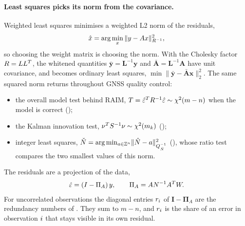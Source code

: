 \documentclass[main.tex]{subfiles}
\begin{document}
\paragraph{Least squares picks its norm from the covariance.}
Weighted least squares minimises a weighted L2 norm of the residuals,
\begin{equation}
\hat{x} = \arg\min_{x}\,
  \lVert y - Ax\rVert^2_{R^{-1}},
\label{eq:la-wls-norm}
\end{equation}
so choosing the weight matrix is choosing the norm.  With the Cholesky
factor $R = LL^{T}$, the whitened quantities
$\bar{\bm{y}} = \bm{L}^{-1}\bm{y}$ and $\bar{\bm{A}} = \bm{L}^{-1}\bm{A}$ have
unit covariance, and  becomes ordinary least squares,
$\min\lVert\bar{\bm{y}} - \bar{\bm{A}}\bm{x}\rVert_2^2$.  The same squared
norm returns throughout GNSS quality control:
\begin{itemize}[leftmargin=*, itemsep=1pt]
\item the overall model test behind RAIM,
      $T = \hat{\varepsilon}^{T}R^{-1}\hat{\varepsilon}
      \sim \chi^2(m-n)$ when the model is correct
      ();
\item the Kalman innovation test,
      $\nu^{T}S^{-1}\nu \sim \chi^2(m_k)$
      ();
\item integer least squares,
      $\check{N} = \arg\min_{a\in\mathbb{Z}^n}
      \lVert\hat{N} - a\rVert^2_{Q_{\hat N}^{-1}}$
      (), whose ratio test compares the two smallest
      values of this norm.
\end{itemize}
The residuals are a projection of the data,
\begin{equation}
\hat{\varepsilon} = (I - \Pi_A)\,y,
\qquad
\Pi_A = AN^{-1}A^{T}W.
\label{eq:la-projector}
\end{equation}
For uncorrelated observations the diagonal entries $r_i$ of
$\bm{I} - \bm{\Pi}_A$ are the redundancy numbers of
.  They sum
to $m - n$, and $r_i$ is the share of an error in observation $i$
that stays visible in its own residual.
\end{document}
